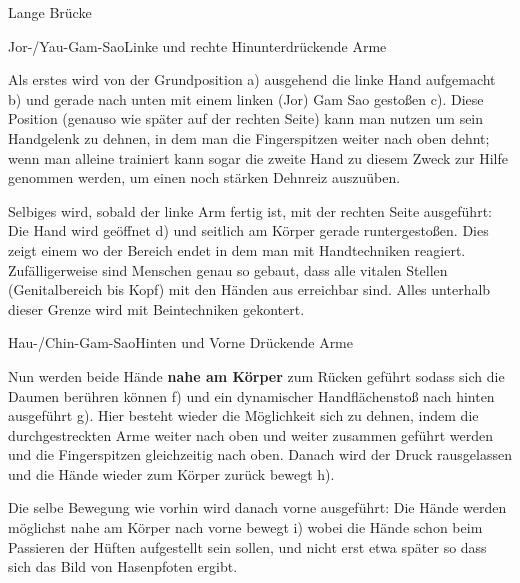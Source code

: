 
\begin{WTSatz}{Lange Br\"ucke}%

	
	\begin{WTSatzTeil}{Jor-/Yau-Gam-Sao}{Linke und rechte Hinunterdr\"uckende Arme}
		
		Als erstes wird von der Grundposition a) ausgehend die linke Hand aufgemacht b) und gerade nach unten mit einem linken (Jor) Gam Sao gesto{\ss}en c). Diese Position (genauso wie sp\"ater auf der rechten Seite) kann man nutzen um sein Handgelenk zu dehnen, in dem man die Fingerspitzen weiter nach oben dehnt; wenn man alleine trainiert kann sogar die zweite Hand zu diesem Zweck zur Hilfe genommen werden, um einen noch st\"arken Dehnreiz auszu\"uben.
		
		
		Selbiges wird, sobald der linke Arm fertig ist, mit der rechten Seite ausgef\"uhrt: Die Hand wird ge\"offnet d) und seitlich am K\"orper gerade runtergesto{\ss}en. Dies zeigt einem wo der Bereich endet in dem man mit Handtechniken reagiert. Zuf\"alligerweise sind Menschen genau so gebaut, dass alle vitalen Stellen (Genitalbereich bis Kopf) mit den H\"anden aus erreichbar sind. Alles unterhalb dieser Grenze wird mit Beintechniken gekontert.
		
	\end{WTSatzTeil}
	\begin{WTSatzTeil}{Hau-/Chin-Gam-Sao}{Hinten und Vorne Dr\"uckende Arme}
		
		Nun werden beide H\"ande \textbf{nahe am K\"orper} zum R\"ucken gef\"uhrt sodass sich die Daumen ber\"uhren k\"onnen f) und ein dynamischer Handfl\"achensto{\ss} nach hinten ausgef\"uhrt g). Hier besteht wieder die M\"oglichkeit sich zu dehnen, indem die durchgestreckten Arme weiter nach oben und weiter zusammen gef\"uhrt werden und die Fingerspitzen gleichzeitig nach oben. Danach wird der Druck rausgelassen und die H\"ande wieder zum K\"orper zur\"uck bewegt h).
		
		
		Die selbe Bewegung wie vorhin wird danach vorne ausgef\"uhrt: Die H\"ande werden m\"oglichst nahe am K\"orper nach vorne bewegt i) wobei die H\"ande schon beim Passieren der H\"uften aufgestellt sein sollen, und nicht erst etwa sp\"ater so dass sich das Bild von Hasenpfoten ergibt.
		

\end{WTSatzTeil}
\end{WTSatz}
